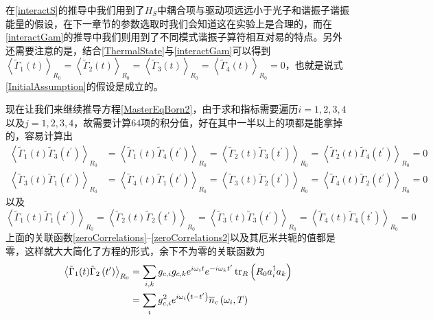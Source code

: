 在\eqref{interactS}的推导中我们用到了$H_S$中耦合项与驱动项远远小于光子和谐振子谐振能量的假设，在下一章节的参数选取时我们会知道这在实验上是合理的，而在\eqref{interactGam}的推导中我们则用到了不同模式谐振子算符相互对易的特点。另外还需要注意的是，结合\eqref{ThermalState}与\eqref{interactGam}可以得到$\left\langle\tilde{\Gamma}_{1}(t)\right\rangle_{R_0}=\left\langle\tilde{\Gamma}_{2}(t)\right\rangle_{R_0}=\left\langle\tilde{\Gamma}_{3}(t)\right\rangle_{R_0}=\left\langle\tilde{\Gamma}_{4}(t)\right\rangle_{R_0}=0$，也就是说式\eqref{InitialAssumption}的假设是成立的。

现在让我们来继续推导方程\eqref{MasterEqBorn2}，由于求和指标需要遍历$i=1,2,3,4$以及$j=1,2,3,4$，故需要计算64项的积分值，好在其中一半以上的项都是能拿掉的，容易计算出
\begin{align}
	\left\langle\tilde{\Gamma}_{1}(t) \tilde{\Gamma}_{3}\left(t^{\prime}\right)\right\rangle_{R_0} &=\left\langle\tilde{\Gamma}_{1}(t) \tilde{\Gamma}_{4}\left(t^{\prime}\right)\right\rangle_{R_0}=\left\langle\tilde{\Gamma}_{2}(t) \tilde{\Gamma}_{3}\left(t^{\prime}\right)\right\rangle_{R_0}=\left\langle\tilde{\Gamma}_{2}(t) \tilde{\Gamma}_{4}\left(t^{\prime}\right)\right\rangle_{R_0}=0 
	\label{zeroCorrelations} \\
	\left\langle\tilde{\Gamma}_{3}(t) \tilde{\Gamma}_{1}\left(t^{\prime}\right)\right\rangle_{R_0} &=\left\langle\tilde{\Gamma}_{4}(t) \tilde{\Gamma}_{1}\left(t^{\prime}\right)\right\rangle_{R_0}=\left\langle\tilde{\Gamma}_{3}(t) \tilde{\Gamma}_{2}\left(t^{\prime}\right)\right\rangle_{R_0}=\left\langle\tilde{\Gamma}_{4}(t) \tilde{\Gamma}_{2}\left(t^{\prime}\right)\right\rangle_{R_0}=0
\end{align}
以及
\begin{equation}
\left\langle\tilde{\Gamma}_{1}(t) \tilde{\Gamma}_{1}\left(t^{\prime}\right)\right\rangle_{R_0} =\left\langle\tilde{\Gamma}_{2}(t) \tilde{\Gamma}_{2}\left(t^{\prime}\right)\right\rangle_{R_0}=\left\langle\tilde{\Gamma}_{3}(t) \tilde{\Gamma}_{3}\left(t^{\prime}\right)\right\rangle_{R_0}=\left\langle\tilde{\Gamma}_{4}(t) \tilde{\Gamma}_{4}\left(t^{\prime}\right)\right\rangle_{R_0}=0
\label{zeroCorrelations2}
\end{equation}
上面的关联函数\eqref{zeroCorrelations}--\eqref{zeroCorrelations2}以及其厄米共轭的值都是零，这样就大大简化了方程的形式，余下不为零的关联函数为
\begin{align}
\left\langle\tilde{\Gamma}_{1}(t) \tilde{\Gamma}_{2}\left(t^{\prime}\right)\right\rangle_{R_0} &=\sum_{i, k} g_{c,i} g_{c,k} e^{i \omega_{i} t} e^{-i \omega_{k} t^{\prime}} \operatorname{tr}_{R}\left(R_{0} a_{i}^{\dag} a_{k}\right) \notag \\
&=\sum_{i} g_{c,i}^{2} e^{i \omega_{i}\left(t-t^{\prime}\right)} \overline{n}_c\left(\omega_{i}, T\right) \label{Correlations1}
\end{align}

